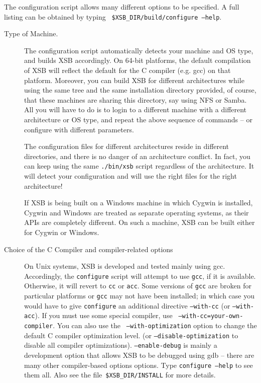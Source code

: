 The configuration script allows many different options to be
specified.  A full listing can be obtained by typing {\tt
\$XSB\_DIR/build/configure --help}.
\begin{description}
\item[Type of Machine.]  The configuration script automatically
  detects your machine and OS type, and builds XSB accordingly. On
  64-bit platforms, the default compilation of XSB will reflect the
  default for the C compiler (e.g. gcc) on that platform.  Moreover,
  you can build XSB for different architectures while using the same
  tree and the same installation directory provided, of course, that
  these machines are sharing this directory, say using NFS or
  Samba. All you will have to do is to login to a different machine
  with a different architecture or OS type, and repeat the above
  sequence of commands -- or configure with different parameters.
  
  The configuration files for different architectures reside in
  different directories, and there is no danger of an architecture
  conflict.  In fact, you can keep using the same {\tt ./bin/xsb}
  script regardless of the architecture. It will detect your
  configuration and will use the right files for the right
  architecture!

  If XSB is being built on a Windows machine in which Cygwin
  is installed, Cygwin and Windows are treated as separate operating
  systems, as their APIs are completely different.  On such a machine, XSB
  can be built either for Cygwin or Windows.

    
\item[Choice of the C Compiler and compiler-related
  options] \label{cc} On Unix systems, XSB is developed and tested
  mainly using gcc.  Accordingly, the {\tt configure} script will
  attempt to use {\tt gcc}, if it is available.  Otherwise, it will
  revert to {\tt cc} or {\tt acc}.  Some versions of {\tt gcc} are
  broken for particular platforms or {\tt gcc} may not have been
  installed; in which case you would have to give {\tt configure} an
  additional directive {\tt --with-cc} (or {\tt --with-acc}).  If you
  must use some special compiler, use {\tt
    --with-cc=your-own-compiler}.  You can also use the {\tt
    --with-optimization} option to change the default C compiler
  optimization level.  (or {\tt --disable-optimization} to disable all
  compiler optimizations).  {\tt --enable-debug} is mainly a
  development option that allows XSB to be debugged using gdb -- there
  are many other compiler-based options options.  Type {\tt configure
    --help} to see them all. Also see the file~\verb'$XSB_DIR/INSTALL'
  for more details.


\end{description}

